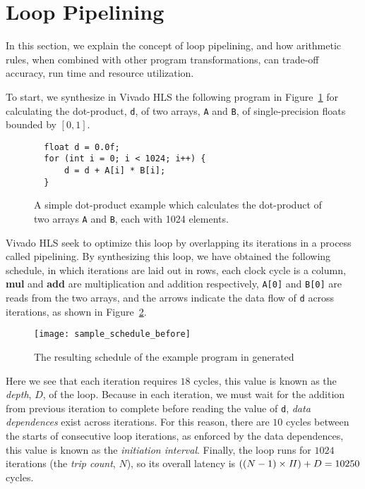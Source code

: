 \section{Loop Pipelining}
\label{bg:sec:loop_pipelining}

In this section, we explain the concept of loop pipelining, and how arithmetic
rules, when combined with other program transformations, can trade-off
accuracy, run time and resource utilization.

To start, we synthesize in Vivado HLS the following program in
Figure~\ref{bg:fig:dotprod} for calculating the dot-product, \verb|d|, of two
arrays, \verb|A| and \verb|B|, of single-precision floats bounded by $[0, 1]$.
\begin{figure}[ht]
\begin{lstlisting}
  float d = 0.0f;
  for (int i = 0; i < 1024; i++) {
      d = d + A[i] * B[i];
  }
\end{lstlisting}
    \caption{%
        A simple dot-product example which calculates the dot-product of two
        arrays \texttt{A} and \texttt{B}, each with 1024 elements.}
    \label{bg:fig:dotprod}
\end{figure}

Vivado HLS seek to optimize this loop by overlapping its iterations in a
process called pipelining.  By synthesizing this loop, we have obtained the
following schedule, in which iterations are laid out in rows, each clock cycle
is a column, \textbf{mul} and \textbf{add} are multiplication and addition
respectively, \verb|A[0]| and \verb|B[0]| are reads from the two arrays, and
the arrows indicate the data flow of \verb|d| across iterations, as shown in
Figure~\ref{bg:fig:sample_schedule_before}.
\begin{figure}[ht]
    \centering
    \texttt{[image: sample\_schedule\_before]}
    \caption{The resulting schedule of the example program in generated}
    \label{bg:fig:sample_schedule_before}
\end{figure}

Here we see that each iteration requires $18$ cycles, this value is known as
the \emph{depth}, $D$, of the loop.  Because in each iteration, we must wait
for the addition from previous iteration to complete before reading the value
of \verb|d|, \emph{data dependences} exist across iterations.  For this reason,
there are $10$ cycles between the starts of consecutive loop iterations, as
enforced by the data dependences, this value is known as the \emph{initiation
interval}.  Finally, the loop runs for $1024$ iterations (the \emph{trip
count}, $N$), so its overall latency is $((N-1)\times \mathit{II}) + D = 10250$ cycles.

